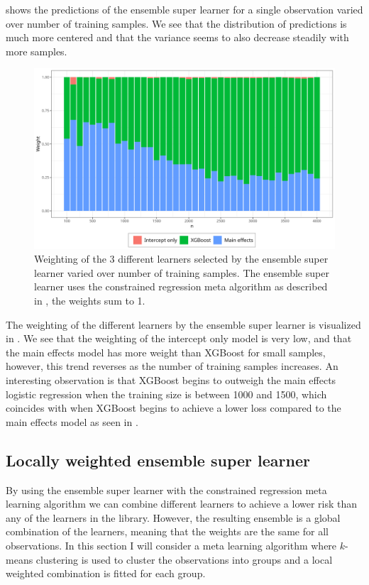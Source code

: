 \documentclass[./main.tex]{subfiles}
\begin{document}
 shows the predictions of the ensemble super learner for a single observation varied over number of training samples. We see that the distribution of predictions is much more centered and that the variance seems to also decrease steadily with more samples. 
\begin{figure}[H]
    \centering
    \includegraphics[width=\textwidth]{figures/esl_weights.png}
    \caption{Weighting of the 3 different learners selected by the ensemble super learner varied over number of training samples. The ensemble super learner uses the constrained regression meta algorithm as described in , the weights sum to 1.}
    \label{fig:esl_weights}
\end{figure}
The weighting of the different learners by the ensemble super learner is visualized in . We see that the weighting of the intercept only model is very low, and that the main effects model has more weight than XGBoost for small samples, however, this trend reverses as the number of training samples increases. An interesting observation is that XGBoost begins to outweigh the main effects logistic regression when the training size is between 1000 and 1500, which coincides with when XGBoost begins to achieve a lower loss compared to the main effects model as seen in .

\subsection{Locally weighted ensemble super learner} \label{locally_weighted_ensemble_super_learner}
By using the ensemble super learner with the constrained regression meta learning algorithm we can combine different learners to achieve a lower risk than any of the learners in the library. However, the resulting ensemble is a global combination of the learners, meaning that the weights are the same for all observations. In this section I will consider a meta learning algorithm where $ k $-means clustering is used to cluster the observations into groups and a local weighted combination is fitted for each group.
\end{document}
